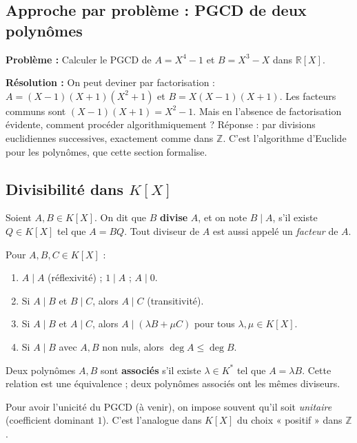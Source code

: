 \subsection{Approche par problème : PGCD de deux polynômes}
\textbf{Problème :} Calculer le PGCD de $A = X^4 - 1$ et $B = X^3 - X$ dans $\mathbb{R}[X]$.

\textbf{Résolution :} On peut deviner par factorisation : $A = (X-1)(X+1)(X^2+1)$ et $B = X(X-1)(X+1)$. Les facteurs communs sont $(X-1)(X+1) = X^2 - 1$. Mais en l'absence de factorisation évidente, comment procéder algorithmiquement ? Réponse : par divisions euclidiennes successives, exactement comme dans $\mathbb{Z}$. C'est l'algorithme d'Euclide pour les polynômes, que cette section formalise.

\subsection{Divisibilité dans $K[X]$}

\begin{definition}[Divisibilité]
Soient $A, B \in K[X]$. On dit que $B$ \textbf{divise} $A$, et on note $B \mid A$, s'il existe $Q \in K[X]$ tel que $A = B Q$. Tout diviseur de $A$ est aussi appelé un \emph{facteur} de $A$.
\end{definition}

\begin{proposition}
Pour $A, B, C \in K[X]$ :
\begin{enumerate}
    \item $A \mid A$ (réflexivité) ; $1 \mid A$ ; $A \mid 0$.
    \item Si $A \mid B$ et $B \mid C$, alors $A \mid C$ (transitivité).
    \item Si $A \mid B$ et $A \mid C$, alors $A \mid (\lambda B + \mu C)$ pour tous $\lambda, \mu \in K[X]$.
    \item Si $A \mid B$ avec $A, B$ non nuls, alors $\deg A \le \deg B$.
\end{enumerate}
\end{proposition}

\begin{definition}
Deux polynômes $A, B$ sont \textbf{associés} s'il existe $\lambda \in K^*$ tel que $A = \lambda B$. Cette relation est une équivalence ; deux polynômes associés ont les mêmes diviseurs.
\end{definition}

\begin{remarque}
Pour avoir l'unicité du PGCD (à venir), on impose souvent qu'il soit \emph{unitaire} (coefficient dominant $1$). C'est l'analogue dans $K[X]$ du choix « positif » dans $\mathbb{Z}$.
\end{remarque}

